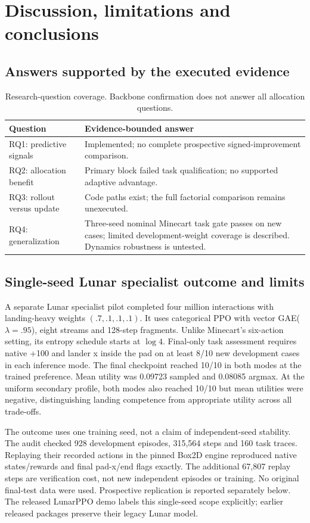 \section{Discussion, limitations and conclusions}
\subsection{Answers supported by the executed evidence}
\begin{table}[htbp]\centering\small
\begin{tabularx}{\textwidth}{lY}\toprule
Question & Evidence-bounded answer\\\midrule
RQ1: predictive signals & Implemented; no complete prospective signed-improvement comparison.\\
RQ2: allocation benefit & Primary block failed task qualification; no supported adaptive advantage.\\
RQ3: rollout versus update & Code paths exist; the full factorial comparison remains unexecuted.\\
RQ4: generalization & Three-seed nominal Minecart task gate passes on new cases; limited development-weight coverage is described. Dynamics robustness is untested.\\\bottomrule
\end{tabularx}
\caption{Research-question coverage. Backbone confirmation does not answer all allocation questions.}
\end{table}

\subsection{Single-seed Lunar specialist outcome and limits}
A separate Lunar specialist pilot completed four million interactions with
landing-heavy weights $(.7,.1,.1,.1)$. It uses categorical PPO with vector
GAE($\lambda=.95$), eight streams and 128-step fragments. Unlike Minecart's
six-action setting, its entropy schedule starts at $\log4$. Final-only task
assessment requires native +100 and lander x inside the pad on at least 8/10
new development cases in each inference mode. The final checkpoint reached
10/10 in both modes at the trained preference. Mean utility was 0.09723 sampled
and 0.08085 argmax. At the uniform secondary profile, both modes also reached
10/10 but mean utilities were negative, distinguishing landing competence from
appropriate utility across all trade-offs.

The outcome uses one training seed, not a claim of independent-seed stability.
The audit checked 928 development episodes, 315,564 steps and 160 task traces.
Replaying their recorded actions in the pinned Box2D engine reproduced native
states/rewards and final pad-x/end flags exactly. The additional 67,807 replay
steps are verification cost, not new independent episodes or training.
No original final-test data were used. Prospective replication is reported
separately below. The released LunarPPO demo labels this single-seed scope
explicitly; earlier released packages preserve their legacy Lunar model.

